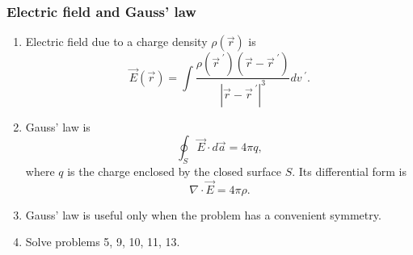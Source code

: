 \documentclass{beamer}
\newcommand{\op}{{\;\prime}}
\newcommand{\dive}{\nabla\cdot}
\begin{document}
\begin{frame}
\frametitle{Electric field and Gauss' law}
\begin{enumerate}
\item Electric field due to a charge density $\rho(\vec{r})$ is
\begin{equation}\label{e6}
\vec{E}(\vec{r})  = \int\frac{\rho(\vec{r}^\op)(\vec{r} - \vec{r}^\op)}{|\vec{r} - \vec{r}^\op|^3}dv^\op.
\end{equation}
\item Gauss' law is
\begin{equation}\label{e7}
\oint_S \vec{E}\cdot d\vec{a} = 4\pi q,
\end{equation}
where $q$ is the charge enclosed by the closed surface $S$. Its differential form is
\begin{equation}\label{e8}
\dive\vec{E} = 4\pi\rho.
\end{equation}

\item Gauss' law is useful only when the problem has a convenient symmetry.

\item Solve problems 5, 9, 10, 11, 13.
\end{enumerate}
\end{frame}
\end{document}
